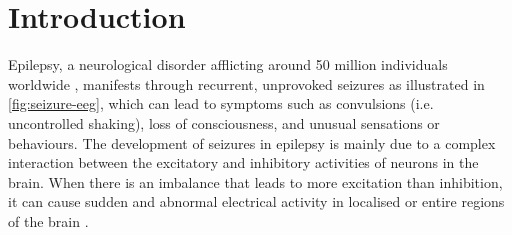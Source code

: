 \documentclass[10pt]{article}
\begin{document}
\begin{sloppypar}
  \begin{abstract}
  \end{abstract}

  \pagebreak


  \section{Introduction}
  \label{sec:introduction}

  Epilepsy, a neurological disorder afflicting around 50 million individuals worldwide \citep{world2019epilepsy}, manifests through recurrent, unprovoked seizures as illustrated in \autoref{fig:seizure-eeg}, which can lead to symptoms such as convulsions (i.e. uncontrolled shaking), loss of consciousness, and unusual sensations or behaviours. The development of seizures in epilepsy is mainly due to a complex interaction between the excitatory and inhibitory activities of neurons in the brain. When there is an imbalance that leads to more excitation than inhibition, it can cause sudden and abnormal electrical activity in localised or entire regions of the brain \citep{robinson_propagation_1997}.


\end{sloppypar}
\end{document}
